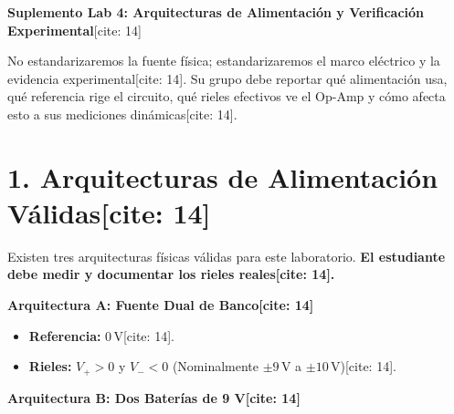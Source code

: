 \documentclass[11pt, a4paper]{article}
\begin{document}
\begin{center}
    \Large\textbf{\textcolor{ucbblue}{Suplemento Lab 4: Arquitecturas de Alimentación y Verificación Experimental}}[cite: 14]
\end{center}

\begin{tcolorbox}[colback=ucbblue!5, colframe=ucbblue, title=\textbf{Objetivo de la Sesión[cite: 14]}]
    No estandarizaremos la fuente física; estandarizaremos el marco eléctrico y la evidencia experimental[cite: 14]. Su grupo debe reportar qué alimentación usa, qué referencia rige el circuito, qué rieles efectivos ve el Op-Amp y cómo afecta esto a sus mediciones dinámicas[cite: 14].
\end{tcolorbox}

\section*{1. Arquitecturas de Alimentación Válidas[cite: 14]}

Existen tres arquitecturas físicas válidas para este laboratorio. \textbf{El estudiante debe medir y documentar los rieles reales[cite: 14].}

\vspace{0.3cm}
\noindent\textbf{Arquitectura A: Fuente Dual de Banco[cite: 14]}
\begin{itemize}
    \setlength{\itemsep}{0pt}
    \item \textbf{Referencia:} $0\,\text{V}$[cite: 14].
    \item \textbf{Rieles:} $V_+ > 0$ y $V_- < 0$ (Nominalmente $\pm 9\,\text{V}$ a $\pm 10\,\text{V}$)[cite: 14].
\end{itemize}

\vspace{0.3cm}
\noindent\textbf{Arquitectura B: Dos Baterías de 9 V[cite: 14]}
\end{document}
